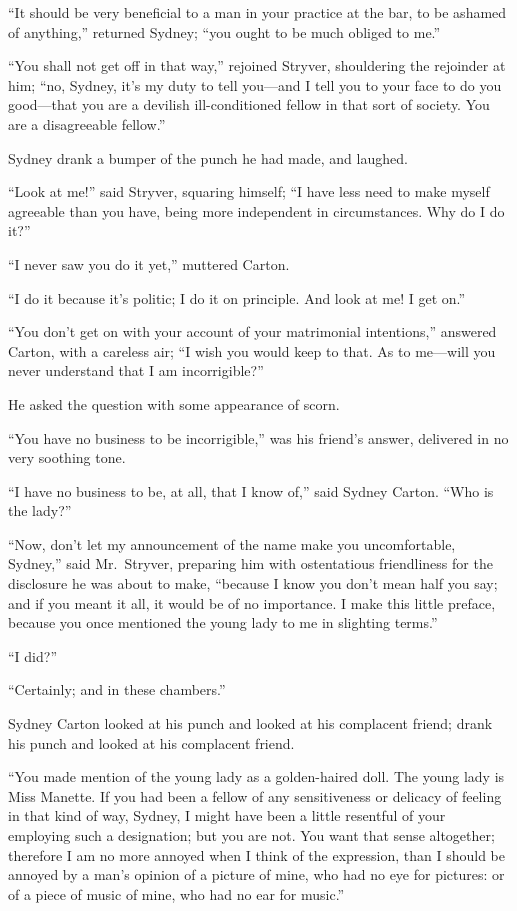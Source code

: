 ``It should be very beneficial to a man in your practice at the bar,
to be ashamed of anything,'' returned Sydney; ``you ought to be much
obliged to me.''

``You shall not get off in that way,'' rejoined Stryver, shouldering the
rejoinder at him; ``no, Sydney, it's my duty to tell you---and I tell you
to your face to do you good---that you are a devilish ill-conditioned
fellow in that sort of society.  You are a disagreeable fellow.''

Sydney drank a bumper of the punch he had made, and laughed.

``Look at me!'' said Stryver, squaring himself; ``I have less need to
make myself agreeable than you have, being more independent in
circumstances.  Why do I do it?''

``I never saw you do it yet,'' muttered Carton.

``I do it because it's politic; I do it on principle.  And look at me!
I get on.''

``You don't get on with your account of your matrimonial intentions,''
answered Carton, with a careless air; ``I wish you would keep to that.
As to me---will you never understand that I am incorrigible?''

He asked the question with some appearance of scorn.

``You have no business to be incorrigible,'' was his friend's answer,
delivered in no very soothing tone.

``I have no business to be, at all, that I know of,'' said Sydney Carton.
``Who is the lady?''

``Now, don't let my announcement of the name make you uncomfortable,
Sydney,'' said Mr.\ Stryver, preparing him with ostentatious
friendliness for the disclosure he was about to make, ``because I know
you don't mean half you say; and if you meant it all, it would be of
no importance.  I make this little preface, because you once mentioned
the young lady to me in slighting terms.''

``I did?''

``Certainly; and in these chambers.''

Sydney Carton looked at his punch and looked at his complacent friend;
drank his punch and looked at his complacent friend.

``You made mention of the young lady as a golden-haired doll.  The young
lady is Miss Manette.  If you had been a fellow of any sensitiveness or
delicacy of feeling in that kind of way, Sydney, I might have been a
little resentful of your employing such a designation; but you are not.
You want that sense altogether; therefore I am no more annoyed when I
think of the expression, than I should be annoyed by a man's opinion of
a picture of mine, who had no eye for pictures:  or of a piece of music
of mine, who had no ear for music.''

